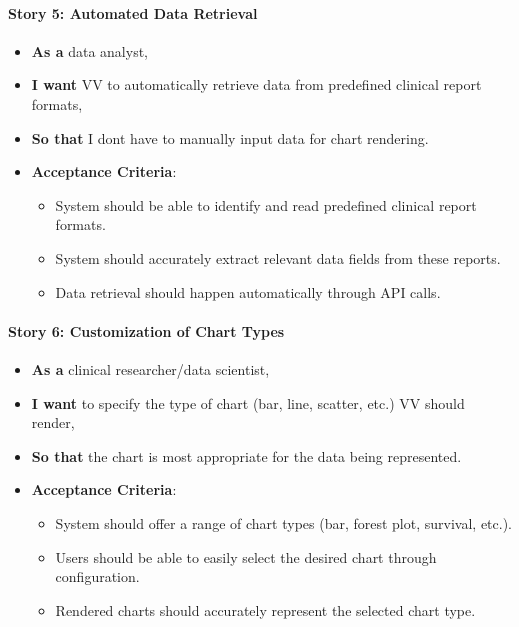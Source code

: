 \paragraph{Story 5: Automated Data
Retrieval}\label{story-5-automated-data-retrieval}

\begin{itemize}
\item
  \textbf{As a} data analyst,
\item
  \textbf{I want} VV to automatically retrieve data from predefined
  clinical report formats,
\item
  \textbf{So that} I don\textquotesingle t have to manually input data
  for chart rendering.
\item
  \textbf{Acceptance Criteria}:

  \begin{itemize}
  \item
    System should be able to identify and read predefined clinical
    report formats.
  \item
    System should accurately extract relevant data fields from these
    reports.
  \item
    Data retrieval should happen automatically through API calls.
  \end{itemize}
\end{itemize}

\paragraph{Story 6: Customization of Chart
Types}\label{story-6-customization-of-chart-types}

\begin{itemize}
\item
  \textbf{As a} clinical researcher/data scientist,
\item
  \textbf{I want} to specify the type of chart (bar, line, scatter,
  etc.) VV should render,
\item
  \textbf{So that} the chart is most appropriate for the data being
  represented.
\item
  \textbf{Acceptance Criteria}:

  \begin{itemize}
  \item
    System should offer a range of chart types (bar, forest plot,
    survival, etc.).
  \item
    Users should be able to easily select the desired chart through
    configuration.
  \item
    Rendered charts should accurately represent the selected chart type.
  \end{itemize}
\end{itemize}

